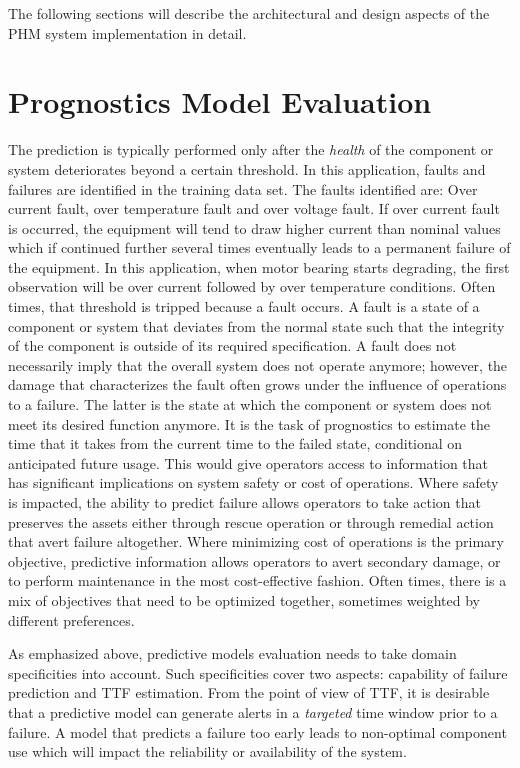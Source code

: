 \documentclass[sigconf]{acmart}
\begin{document}
The following sections will describe the architectural and design aspects of the PHM system implementation in detail.

\section{Prognostics Model Evaluation}
\cite{Saxena2009} The prediction is typically performed only after the \textit{health} of the component or system deteriorates beyond a certain threshold. In this application, faults and failures are identified in the training data set. The faults identified are: Over current fault, over temperature fault and over voltage fault. If over current fault is occurred, the equipment will tend to draw higher current than nominal values which if continued further several times eventually leads to a permanent failure of the equipment. In this application, when motor bearing starts degrading, the first observation will be over current followed by over temperature conditions.
Often times, that threshold is tripped because a fault occurs. A fault is a state of a component or system that deviates from the normal state such that the integrity of the component is outside of its required specification. A fault does not necessarily imply that the overall system does not operate anymore; however, the damage that characterizes the fault often grows under the influence of operations to a failure. The latter is the state at which the component or system does not meet its desired function anymore. It is the task of prognostics to estimate the time that it takes from the current time to the failed state, conditional on anticipated future usage. This would give operators access to information that has significant implications on system safety or cost of operations. Where safety is impacted, the ability to predict failure allows operators to take action that preserves the assets either through rescue operation or through remedial action that avert failure altogether. Where minimizing cost of operations is the primary objective, predictive information allows operators to avert secondary damage, or to perform maintenance in the most cost-effective fashion. Often times, there is a mix of objectives that need to be optimized together, sometimes weighted by different preferences.

As emphasized above, predictive models evaluation needs to take domain specificities into account. Such specificities cover two aspects: capability of failure prediction and TTF estimation. From the point of view of TTF, it is desirable that a predictive model can generate alerts in a \textit{targeted} time window prior to a failure. A model that predicts a failure too early leads to non-optimal component use \cite{Yang2014} which will impact the reliability or availability of the system.
\end{document}

